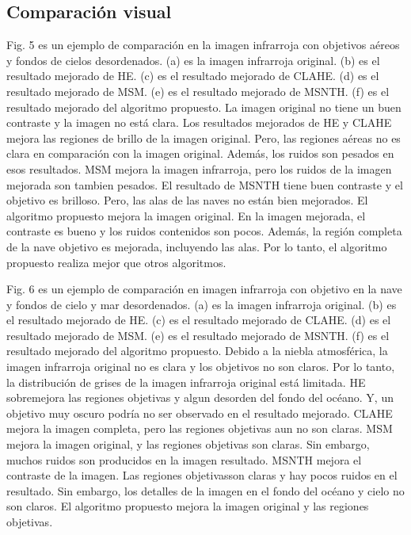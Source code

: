 \documentclass[a4paper, 11 pt, conference]{ieeeconf}      %
\begin{document}
\subsection{Comparaci\'on visual}

Fig. 5 es un ejemplo de comparaci\'on en la imagen infrarroja con objetivos a\'ereos y fondos de cielos desordenados. (a) es la imagen infrarroja original. (b) es el resultado mejorado de HE. (c) es el resultado mejorado de CLAHE. (d) es el resultado mejorado de MSM. (e) es el resultado mejorado de MSNTH. (f) es el resultado mejorado del algoritmo propuesto. La imagen original no tiene un buen contraste y la imagen no est\'a clara. Los resultados mejorados de HE y CLAHE mejora las regiones de brillo de la imagen original. Pero, las regiones a\'ereas no es clara en comparaci\'on con la imagen original. Adem\'as, los ruidos son pesados en esos resultados. MSM mejora la imagen infrarroja, pero los ruidos de la imagen mejorada son tambien pesados. El resultado de MSNTH tiene buen  contraste y el objetivo es brilloso. Pero, las alas de las naves no est\'an bien mejorados. El algoritmo propuesto mejora la imagen original. En la imagen mejorada, el contraste es bueno y los ruidos contenidos son pocos. Adem\'as, la regi\'on completa de la nave objetivo es mejorada, incluyendo las alas. Por lo tanto, el algoritmo propuesto realiza mejor que otros algoritmos.

Fig. 6 es un ejemplo de comparaci\'on en imagen infrarroja con objetivo en la nave y fondos de cielo y mar desordenados. (a) es la imagen infrarroja original. (b) es el resultado mejorado de HE. (c) es el resultado mejorado de CLAHE. (d) es el resultado mejorado de MSM. (e) es el resultado mejorado de MSNTH. (f) es el resultado mejorado del algoritmo propuesto. Debido a la niebla atmosf\'erica, la imagen infrarroja original no es clara y los objetivos no son claros. Por lo tanto, la distribuci\'on de grises de la imagen infrarroja original est\'a limitada. HE sobremejora las regiones objetivas y algun desorden del fondo del oc\'eano. Y, un objetivo muy oscuro podr\'ia no ser observado en el resultado mejorado.  CLAHE mejora la imagen completa, pero las regiones objetivas aun no son claras. MSM mejora la imagen original, y las regiones objetivas son claras. Sin embargo, muchos ruidos son producidos en la imagen resultado. MSNTH mejora el contraste de la imagen. Las regiones objetivasson claras y hay pocos ruidos en el resultado. Sin embargo, los detalles de la imagen en el fondo del oc\'eano y cielo no son claros. El algoritmo propuesto mejora la imagen original y las regiones objetivas.
\end{document}
